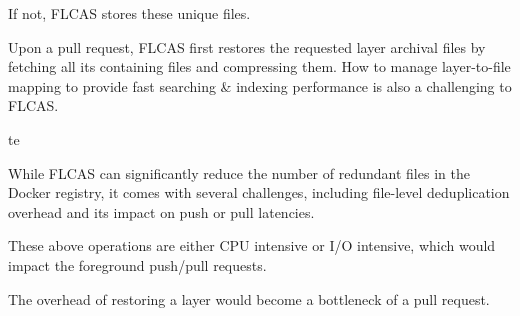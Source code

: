 If not, FLCAS stores these unique files.

%
Upon a pull request, FLCAS first restores the requested 
layer archival files by fetching all its containing files and compressing them.
%
How to manage layer-to-file mapping to provide fast searching \& indexing performance 
is also a challenging to FLCAS.




%

te

While FLCAS can significantly reduce the number of redundant files in the Docker
registry, it comes with several challenges, 
including file-level deduplication overhead and its impact on push or pull latencies.

These above operations are either CPU intensive or I/O intensive, which would impact 
the foreground push/pull requests.

The overhead of restoring a layer would become a bottleneck of a pull request.




